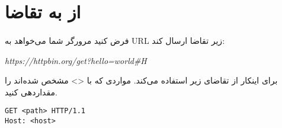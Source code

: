 \documentclass[../main.tex]{subfiles}
\begin{document}
\section{از  به تقاضا}

\paragraph{}
فرض کنید مرورگر شما می‌خواهد به URL زیر تقاضا ارسال کند:

\begin{latin}
  \textit{https://httpbin.org/get?hello=world\#H}
\end{latin}

برای اینکار از تقاضای زیر استفاده می‌کند. مواردی که با <> مشخص شده‌اند را مقداردهی کنید.

\begin{latin}
\begin{verbatim}
GET <path> HTTP/1.1
Host: <host>
\end{verbatim}
\end{latin}
\end{document}

